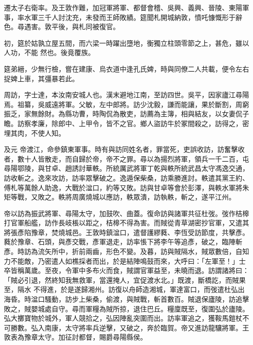 \begin{pinyinscope}
 遷太子右衛率。及王敦作難，加冠軍將軍、都督會稽、吳興、義興、晉陵、東陽軍事，率水軍三千人討沈充，未發而王師敗績。筵聞札開城納敦，憤吒慷慨形于辭色。尋遇害。敦平後，與札同被復官。



 初，筵於姑孰立屋五間，而六梁一時躍出墮地，衡獨立柱頭零節之上，甚危，雖以人功，不能
 然也。後竟覆族。



 筵弟縉，少無行檢，嘗在建康、烏衣道中逢孔氏婢，時與同僚二人共載，便令左右捉婢上車，其彊暴若此。



 周訪，字士達，本汝南安城人也。漢末避地江南，至訪四世。吳平，因家廬江尋陽焉。祖纂，吳威遠將軍。父敏，左中郎將。訪少沈毅，謙而能讓，果於斷割，周窮振乏，家無餘財。為縣功曹，時陶侃為散吏，訪薦為主簿，相與結友，以女妻侃子瞻。訪察孝廉，除郎中、上甲令，皆不之官。鄉人盜訪牛於冢間殺之，訪得之，密埋其肉，不使人知。



 及元
 帝渡江，命參鎮東軍事。時有與訪同姓名者，罪當死，吏誤收訪，訪奮擊收者，數十人皆散走，而自歸於帝，帝不之罪。尋以為揚烈將軍，領兵一千二百，屯尋陽鄂陵，與甘卓、趙誘討華軼。所統厲武將軍丁乾與軼所統武昌太守馮逸交通，訪收斬之。逸來攻訪，訪率眾擊破之。逸遁保柴桑，訪乘勝進討。軼遣其黨王約、傅札等萬餘人助逸，大戰於湓口，約等又敗。訪與甘卓等會於彭澤，與軼水軍將朱矩等戰，又敗之。軼將周廣燒城以應訪，軼眾潰，訪執軼，斬之，遂平江州。



 帝以訪為振武將軍、尋陽太守，加鼓吹、曲蓋。復命訪與諸軍共征杜弢。弢作桔槔
 打官軍船艦，訪作長岐棖以距之，桔槔不得為害。而賊從青草湖密抄官軍，又遣其將張彥陷豫章，焚燒城邑。王敦時鎮湓口，遣督護繆蕤、李恆受訪節度，共擊彥。蕤於豫章、石頭，與彥交戰，彥軍退走，訪率悵下將李午等追彥，破之，臨陣斬彥。時訪為流矢所中，折前兩齒，形色不變。及暮，訪與賊隔水，賊眾數倍，自知力不能敵，乃密遣人如樵採者而出，於是結陣鳴鼓而來，大呼曰：「左軍至！」士卒皆稱萬歲。至夜，令軍中多布火而食，賊謂官軍益至，未曉而退。訪謂諸將曰：「賊必引退，然終知我無救軍，當還掩人，宜促渡水北。」既渡，斷橋訖，而賊果至，隔水
 不得進，於是遂歸湘州。訪復以舟師造湘城，軍達富口，而弢遣杜弘出海昏。時湓口騷動，訪步上柴桑，偷渡，與賊戰，斬首數百。賊退保廬陵，訪追擊敗之，賊嬰城處自守。尋而軍糧為賊所掠，退住巴丘。糧廩既至，復圍弘於廬陵。弘大擲寶物於城外，軍人競拾之，弘因陣亂突圍而出。訪率軍追之，獲鞍馬鎧杖不可勝數。弘入南康，太守將率兵逆擊，又破之，奔於臨賀。帝又進訪龍驤將軍。王敦表為豫章太守。加征討都督，賜爵尋陽縣侯。




\end{pinyinscope}
